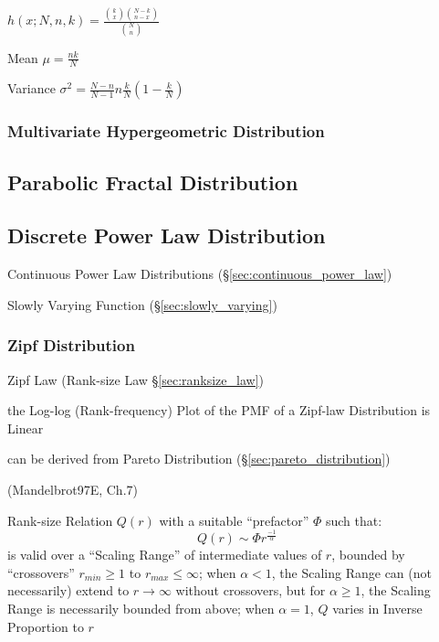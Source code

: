 $h(x; N, n, k) = \frac{\binom{k}{x} \binom{N-k}{n-x}}{\binom{N}{n}}$

Mean $\mu = \frac{nk}{N}$

Variance $\sigma^2 = \frac{N-n}{N-1} n \frac{k}{N}(1 - \frac{k}{N})$



\subsubsection{Multivariate Hypergeometric Distribution}
\label{sec:multivariate_hypergeometric}



\subsection{Parabolic Fractal Distribution}
\label{sec:parabolic_fractal_distribution}

\subsection{Discrete Power Law Distribution}\label{sec:discrete_power_law}

\fist Continuous Power Law Distributions (\S\ref{sec:continuous_power_law})

Slowly Varying Function (\S\ref{sec:slowly_varying})



\subsubsection{Zipf Distribution}\label{sec:zipf_distribution}

Zipf Law (Rank-size Law \S\ref{sec:ranksize_law})

the Log-log (Rank-frequency) Plot of the PMF of a Zipf-law Distribution is
Linear

can be derived from Pareto Distribution (\S\ref{sec:pareto_distribution})

(Mandelbrot97E, Ch.7)

Rank-size Relation $Q(r)$ with a suitable ``prefactor'' $\Phi$ such that:
\[
  Q(r) \sim \Phi r^\frac{-1}{\alpha}
\]
is valid over a ``Scaling Range'' of intermediate values of $r$, bounded by
``crossovers'' $r_{min} \geq 1$ to $r_{max} \leq \infty$; when $\alpha < 1$, the
Scaling Range can (not necessarily) extend to $r \to \infty$ without crossovers,
but for $\alpha \geq 1$, the Scaling Range is necessarily bounded from above;
when $\alpha = 1$, $Q$ varies in Inverse Proportion to $r$




